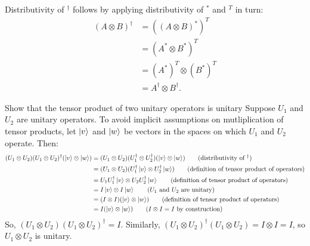 \begin{comment}
\begin{align*}
	(A\otimes B)^T &=
	\begin{bmatrix}
		A_{11} B & \cdots & A_{1n} B \\
		\vdots & \ddots  & \vdots \\
		A_{m1}B & \cdots & A_{mn} B
	\end{bmatrix}^T \\
	&=
	\begin{bmatrix}
		A_{11} B^T & \cdots & A_{m1} B^T \\
		\vdots & \ddots  & \vdots \\
		A_{1n} B^T & \cdots & A_{mn} B^T
	\end{bmatrix} \\
	&=
	\begin{bmatrix}
		A_{11} B^T & \cdots & A_{1m} B^T \\
		\vdots & \ddots  & \vdots \\
		A_{n1} B^T & \cdots & A_{nm} B^T
	\end{bmatrix} \\
	&= A^T \otimes B^T.
\end{align*}
\end{comment}
Distributivity of $^\dagger$ follows by applying distributivity of $^*$ and $^T$ in turn:
\begin{align*}
	(A\otimes B)^\dagger&=((A \otimes B)^*)^T	\tag{definition of $\dagger$}\\
		&= (A^* \otimes B^*)^T \tag{distribute $^*$}\\
		&= (A^*)^T \otimes (B^*)^T \tag{distribute $^T$}\\
		&= A^\dagger \otimes B^\dagger \tag{definition of $^\dagger$}.
\end{align*}

 Show that the tensor product of two unitary operators is unitary
\Soln
Suppose $U_1$ and $U_2$ are unitary operators. To avoid implicit assumptions on mutliplication of tensor products, let $\ket{v}$ and $\ket{w}$ be vectors in the spaces on which $U_1$ and $U_2$ operate.  Then:
\begin{align*}
	(U_1 \otimes U_2) (U_1 \otimes U_2)^\dagger(\ket{v}\otimes\ket{w}) &= (U_1 \otimes U_2) ( U_1^\dagger \otimes  U_2^\dagger)(\ket{v}\otimes\ket{w})\tag{distributivity of $^\dagger$} \\
	&=(U_1 \otimes U_2)(U_1^\dagger\ket{v}\otimes U_2^\dagger\ket{w}) \tag{definition of tensor product of operators} \\
	&=U_1U_1^\dagger\ket{v}\otimes U_2U_2^\dagger\ket{w} \tag{definition of tensor product of operators} \\
	&= I\ket{v} \otimes I\ket{w} \tag{$U_1$ and $U_2$ are unitary} \\
	&= (I\otimes I)(\ket{v}\otimes\ket{w}) \tag{definition of tensor product of operators} \\
	&= I(\ket{v}\otimes\ket{w}) \tag{$I\otimes I = I$ by construction}
\end{align*}
So, $(U_1\otimes U_2)(U_1\otimes U_2)^\dagger = I$. Similarly, $(U_1 \otimes U_2)^\dagger (U_1 \otimes U_2)  = I \otimes I =  I$, so $U_1\otimes U_2$ is unitary.

